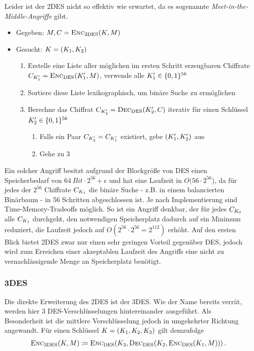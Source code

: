 Leider ist der 2DES nicht so effektiv wie erwartet, da es sogenannte \emph{Meet-in-the-Middle-Angriffe} gibt.
\begin{itemize}
	\item Gegeben: $M, C = \textsc{Enc}_{\textnormal{2DES}}(K, M)$
	\item Gesucht: $K = (K_{1},K_{2})$
	\begin{enumerate}
		\item Erstelle eine Liste aller möglichen im ersten Schritt erzeugbaren Chiffrate $C_{K'_{1}} = \textsc{Enc}_{\textnormal{DES}}(K'_{1}, M)$, \dh verwende alle $K'_{1} \in \{0,1\}^{56}$
		\item Sortiere diese Liste lexikographisch, um binäre Suche zu ermöglichen
		\item Berechne das Chiffrat $C_{K'_{2}} = \textsc{Dec}_{\textnormal{DES}}(K'_{2}, C)$ iterativ für einen Schlüssel $K'_{2} \in \{0,1\}^{56}$
		\begin{enumerate}
			\item Falls ein Paar $C_{K'_2} = C_{K'_{1}}$ existiert, gebe $(K'_{1},K'_{2})$ aus
			\item Gehe zu 3
		\end{enumerate}
	\end{enumerate}
\end{itemize}

Ein solcher Angriff besitzt aufgrund der Blockgröße von DES einen Speicherbedarf von $64\ Bit \cdot 2^{56} + \epsilon$ und hat eine Laufzeit in $O(56 \cdot 2^{56}$), da für jedes der $2^{56}$ Chiffrate $C_{K_1}$ die binäre Suche - z.B. in einem balancierten Binärbaum - in 56 Schritten abgeschlossen ist. Je nach Implementierung sind Time-Memory-Tradeoffs möglich. So ist ein Angriff denkbar, der für jedes $C_{K_0}$ alle $C_{K_1}$ durchgeht, den notwendigen Speicherplatz dadurch auf ein Minimum reduziert, die Laufzeit jedoch auf $O(2^{56} \cdot 2^{56} = 2^{112})$ erhöht. Auf den ersten Blick bietet 2DES zwar nur einen sehr geringen Vorteil gegenüber DES, jedoch wird zum Erreichen einer akzeptablen Laufzeit des Angriffs eine nicht zu vernachlässigende Menge an Speicherplatz benötigt.

\subsubsection{3DES}
\label{sssec:3des}
Die direkte Erweiterung des 2DES ist der 3DES. Wie der Name bereits verrät, werden hier 3 DES-Verschlüsselungen hintereinander ausgeführt. Als Besonderheit ist die mittlere Verschlüsselung jedoch in umgekehrter Richtung angewandt. Für einen Schlüssel $K = (K_{1}, K_{2}, K_{3})$ gilt demzufolge
\begin{align*}
	\textsc{Enc}_{\textnormal{3DES}}(K, M) \coloneqq \textsc{Enc}_{\textnormal{DES}}(K_{3}, \textsc{Dec}_{\textnormal{DES}}(K_{2}, \textsc{Enc}_{\textnormal{DES}}(K_{1}, M)))\, .
\end{align*}

